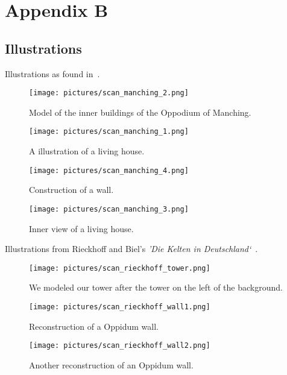 \clearpage
\pagebreak
\section{Appendix B}
\label{appendix-b}

\subsection*{Illustrations}

Illustrations as found in~\cite{kraemer-oppidum-maching}.

\begin{figure}[ht]
	\centering
	\texttt{[image: pictures/scan\_manching\_2.png]}
	\caption{Model of the inner buildings of the  Oppodium of Manching.}
\end{figure}

\begin{figure}[ht]
	\centering
	\texttt{[image: pictures/scan\_manching\_1.png]}
	\caption{A illustration of a living house.}
\end{figure}

\begin{figure}[ht]
	\centering
	\texttt{[image: pictures/scan\_manching\_4.png]}
	\caption{Construction of a wall.}
\end{figure}


\begin{figure}[ht]
	\centering
	\texttt{[image: pictures/scan\_manching\_3.png]}
	\caption{Inner view of a living house.}
\end{figure}

\clearpage
\pagebreak
Illustrations from Rieckhoff and Biel's \textit{'Die Kelten in Deutschland`}~\cite{rieckhoff-walls1}\cite{rieckhoff-walls2}\cite{rieckhoff-tower}.

\begin{figure}[ht]
	\centering
	\texttt{[image: pictures/scan\_rieckhoff\_tower.png]}
	\caption{We modeled our tower after the tower on the left of the background.}
\end{figure}

\begin{figure}[ht]
	\centering
	\texttt{[image: pictures/scan\_rieckhoff\_wall1.png]}
	\caption{Reconstruction of a Oppidum wall.}
\end{figure}

\begin{figure}[ht]
	\centering
	\texttt{[image: pictures/scan\_rieckhoff\_wall2.png]}
	\caption{Another reconstruction of an Oppidum wall.}
\end{figure}

